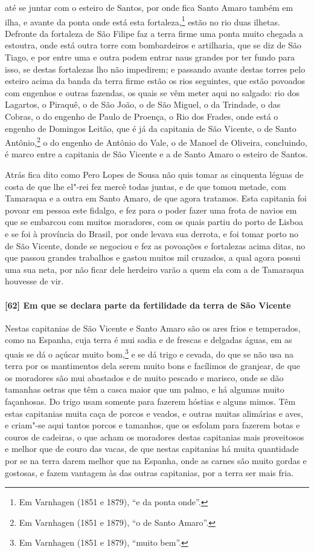 até se juntar com o esteiro de Santos, por onde fica Santo Amaro também em ilha, e avante
da ponta onde está esta fortaleza,\footnote{ Em Varnhagen (1851 e 1879), ``e da ponta
onde''.} estão no rio duas ilhetas. Defronte da fortaleza de São Filipe faz a terra firme
uma ponta muito chegada a estoutra, onde está outra torre com bombardeiros e artilharia,
que se diz de São Tiago, e por entre uma e outra podem entrar naus grandes por ter fundo
para isso, se destas fortalezas lho não impedirem; e passando avante destas torres pelo
esteiro acima da banda da terra firme estão os rios seguintes, que estão povoados com
engenhos e outras fazendas, os quais se vêm meter aqui no salgado: rio dos Lagartos, o
Piraquê, o de São João, o de São Miguel, o da Trindade, o das Cobras, o do engenho de
Paulo de Proença, o Rio dos Frades, onde está o engenho de Domingos Leitão, que é já da
capitania de São Vicente, o de Santo Antônio,\footnote{ Em Varnhagen (1851 e 1879), ``o de
Santo Amaro''.} o do engenho de Antônio do Vale, o de Manoel de Oliveira, concluindo, é
marco entre a capitania de São Vicente e a de Santo Amaro o esteiro de Santos.

Atrás fica dito como Pero Lopes de Sousa não quis tomar as cinquenta léguas de costa de
que lhe el"-rei fez mercê todas juntas, e de que tomou metade, com Tamaraqua e a outra em
Santo Amaro, de que agora tratamos. Esta capitania foi povoar em pessoa este fidalgo, e
fez para o poder fazer uma frota de navios em que se embarcou com muitos moradores, com os
quais partiu do porto de Lisboa e se foi à província do Brasil, por onde levava sua
derrota, e foi tomar porto no de São Vicente, donde se negociou e fez as povoações e
fortalezas acima ditas, no que passou grandes trabalhos e gastou muitos mil cruzados, a
qual agora possui uma sua neta, por não ficar dele herdeiro varão a quem ela com a de
Tamaraqua houvesse de vir.

\paragraph{[62] Em que se declara parte da fertilidade da terra de São Vicente} \quad
Nestas capitanias de São Vicente e Santo Amaro são os ares frios e temperados, como na
Espanha, cuja terra é mui sadia e de frescas e delgadas águas, em as quais se dá o açúcar
muito bom,\footnote{ Em Varnhagen (1851 e 1879), ``muito bem''.} e se dá trigo e cevada,
do que se não usa na terra por os mantimentos dela serem muito bons e facílimos de
granjear, de que os moradores são mui abastados e de muito pescado e marisco, onde se dão
tamanhas ostras que têm a casca maior que um palmo, e há algumas muito façanhosas. Do
trigo usam somente para fazerem hóstias e alguns mimos. Têm estas capitanias muita caça de
porcos e veados, e outras muitas alimárias e aves, e criam"-se aqui tantos porcos e
tamanhos, que os esfolam para fazerem botas e couros de cadeiras, o que acham os moradores
destas capitanias mais proveitosos e melhor que de couro das vacas, de que nestas
capitanias há muita quantidade por se na terra darem melhor que na Espanha, onde as carnes
são muito gordas e gostosas, e fazem vantagem às das outras capitanias, por a terra ser
mais fria.

